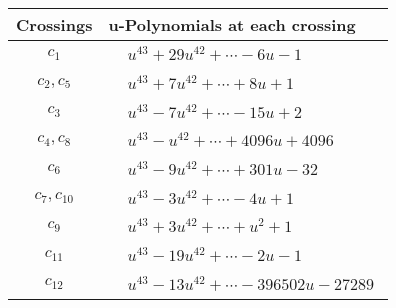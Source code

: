 \documentclass[1p]{elsarticle_modified}
\theoremstyle{definition}
\begin{document}
\begin{tabular}{m{50pt}|m{274pt}}
Crossings & \hspace{64pt}u-Polynomials at each crossing \\
\hline $$\begin{aligned}c_{1}\end{aligned}$$&$\begin{aligned}
&u^{43}+29 u^{42}+\cdots-6 u-1
\end{aligned}$\\
\hline $$\begin{aligned}c_{2},c_{5}\end{aligned}$$&$\begin{aligned}
&u^{43}+7 u^{42}+\cdots+8 u+1
\end{aligned}$\\
\hline $$\begin{aligned}c_{3}\end{aligned}$$&$\begin{aligned}
&u^{43}-7 u^{42}+\cdots-15 u+2
\end{aligned}$\\
\hline $$\begin{aligned}c_{4},c_{8}\end{aligned}$$&$\begin{aligned}
&u^{43}- u^{42}+\cdots+4096 u+4096
\end{aligned}$\\
\hline $$\begin{aligned}c_{6}\end{aligned}$$&$\begin{aligned}
&u^{43}-9 u^{42}+\cdots+301 u-32
\end{aligned}$\\
\hline $$\begin{aligned}c_{7},c_{10}\end{aligned}$$&$\begin{aligned}
&u^{43}-3 u^{42}+\cdots-4 u+1
\end{aligned}$\\
\hline $$\begin{aligned}c_{9}\end{aligned}$$&$\begin{aligned}
&u^{43}+3 u^{42}+\cdots+u^2+1
\end{aligned}$\\
\hline $$\begin{aligned}c_{11}\end{aligned}$$&$\begin{aligned}
&u^{43}-19 u^{42}+\cdots-2 u-1
\end{aligned}$\\
\hline $$\begin{aligned}c_{12}\end{aligned}$$&$\begin{aligned}
&u^{43}-13 u^{42}+\cdots-396502 u-27289
\end{aligned}$\\
\hline
\end{tabular}\\~\\
\end{document}
